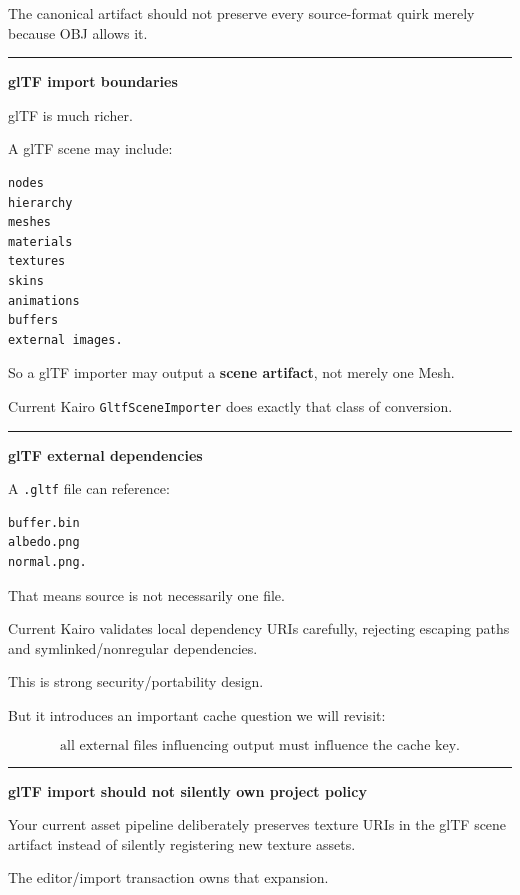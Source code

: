 The canonical artifact should not preserve every source-format quirk merely because OBJ allows it.

\begin{center}\rule{0.5\linewidth}{0.5pt}\end{center}

\textbf{glTF import boundaries}

glTF is much richer.

A glTF scene may include:

\begin{verbatim}
nodes
hierarchy
meshes
materials
textures
skins
animations
buffers
external images.
\end{verbatim}

So a glTF importer may output a \textbf{scene artifact}, not merely one Mesh.

Current Kairo \texttt{GltfSceneImporter} does exactly that class of conversion.

\begin{center}\rule{0.5\linewidth}{0.5pt}\end{center}

\textbf{glTF external dependencies}

A \texttt{.gltf} file can reference:

\begin{verbatim}
buffer.bin
albedo.png
normal.png.
\end{verbatim}

That means source is not necessarily one file.

Current Kairo validates local dependency URIs carefully, rejecting escaping paths and symlinked/nonregular dependencies.

This is strong security/portability design.

But it introduces an important cache question we will revisit:

\[
\boxed{
\text{all external files influencing output must influence the cache key}.
}
\]

\begin{center}\rule{0.5\linewidth}{0.5pt}\end{center}

\textbf{glTF import should not silently own project policy}

Your current asset pipeline deliberately preserves texture URIs in the glTF scene artifact instead of silently registering new texture assets.

The editor/import transaction owns that expansion.

